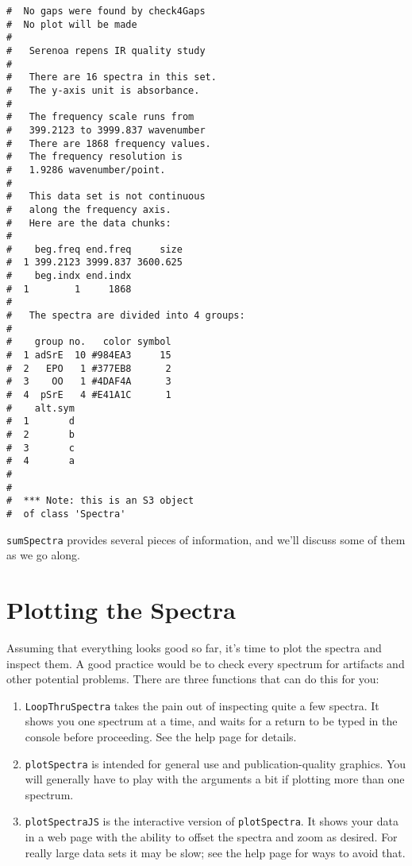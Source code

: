 \documentclass[letter,10pt,twocolumn,twoside,printwatermark=false]{pinp}
\begin{document}
\begin{ShadedResult}
\begin{verbatim}
#  No gaps were found by check4Gaps
#  No plot will be made
#  
#   Serenoa repens IR quality study 
#  
#   There are 16 spectra in this set.
#   The y-axis unit is absorbance.
#  
#   The frequency scale runs from
#   399.2123 to 3999.837 wavenumber
#   There are 1868 frequency values.
#   The frequency resolution is
#   1.9286 wavenumber/point.
#  
#   This data set is not continuous
#   along the frequency axis.
#   Here are the data chunks:
#  
#    beg.freq end.freq     size
#  1 399.2123 3999.837 3600.625
#    beg.indx end.indx
#  1        1     1868
#  
#   The spectra are divided into 4 groups: 
#  
#    group no.   color symbol
#  1 adSrE  10 #984EA3     15
#  2   EPO   1 #377EB8      2
#  3    OO   1 #4DAF4A      3
#  4  pSrE   4 #E41A1C      1
#    alt.sym
#  1       d
#  2       b
#  3       c
#  4       a
#  
#  
#  *** Note: this is an S3 object
#  of class 'Spectra'
\end{verbatim}
\end{ShadedResult}

\texttt{sumSpectra} provides several pieces of information, and we'll
discuss some of them as we go along.

\hypertarget{plotting-the-spectra}{%
\section{Plotting the Spectra}\label{plotting-the-spectra}}

Assuming that everything looks good so far, it's time to plot the
spectra and inspect them. A good practice would be to check every
spectrum for artifacts and other potential problems. There are three
functions that can do this for you:

\begin{enumerate}
  \item \texttt{LoopThruSpectra} takes the pain out of inspecting quite a few spectra.  It shows you one spectrum at a time, and waits for a return to be typed in the console before proceeding.  See the help page for details.
  \item \texttt{plotSpectra} is intended for general use and publication-quality graphics.  You will generally have to play with the arguments a bit if plotting more than one spectrum.
  \item \texttt{plotSpectraJS} is the interactive version of \texttt{plotSpectra}.  It shows your data in a web page with the ability to offset the spectra and zoom as desired.  For really large data sets it may be slow; see the help page for ways to avoid that.
\end{enumerate}
\end{document}
